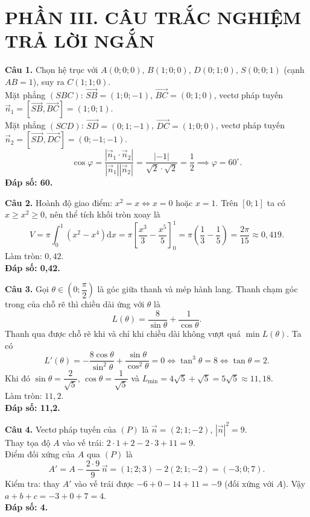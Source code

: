 \documentclass[12pt,a4paper]{article}
\begin{document}
\vspace{0.4cm}
\section*{\large PHẦN III. CÂU TRẮC NGHIỆM TRẢ LỜI NGẮN}

\noindent\textbf{Câu 1.} Chọn hệ trục với $A(0; 0; 0)$, $B(1; 0; 0)$, $D(0; 1; 0)$, $S(0; 0; 1)$ (cạnh $AB = 1$), suy ra $C(1; 1; 0)$.\\
Mặt phẳng $(SBC)$: $\overrightarrow{SB} = (1; 0; -1)$, $\overrightarrow{BC} = (0; 1; 0)$, vectơ pháp tuyến $\vec{n}_1 = [\overrightarrow{SB}, \overrightarrow{BC}] = (1; 0; 1)$.\\
Mặt phẳng $(SCD)$: $\overrightarrow{SD} = (0; 1; -1)$, $\overrightarrow{DC} = (1; 0; 0)$, vectơ pháp tuyến $\vec{n}_2 = [\overrightarrow{SD}, \overrightarrow{DC}] = (0; -1; -1)$.
\[
\cos\varphi = \dfrac{|\vec{n}_1\cdot\vec{n}_2|}{|\vec{n}_1||\vec{n}_2|} = \dfrac{|-1|}{\sqrt{2}\cdot\sqrt{2}} = \dfrac{1}{2} \implies \varphi = 60^\circ.
\]
\textbf{Đáp số: 60.}

\vspace{0.3cm}
\noindent\textbf{Câu 2.} Hoành độ giao điểm: $x^2 = x \iff x = 0$ hoặc $x = 1$. Trên $[0; 1]$ ta có $x \ge x^2 \ge 0$, nên thể tích khối tròn xoay là
\[
V = \pi\int_0^1 \left(x^2 - x^4\right)\mathrm{d}x = \pi\left[\dfrac{x^3}{3} - \dfrac{x^5}{5}\right]_0^1 = \pi\left(\dfrac{1}{3} - \dfrac{1}{5}\right) = \dfrac{2\pi}{15} \approx 0{,}419.
\]
Làm tròn: $0{,}42$.\\
\textbf{Đáp số: 0,42.}

\vspace{0.3cm}
\noindent\textbf{Câu 3.} Gọi $\theta \in \left(0; \dfrac{\pi}{2}\right)$ là góc giữa thanh và mép hành lang. Thanh chạm góc trong của chỗ rẽ thì chiều dài ứng với $\theta$ là
\[
L(\theta) = \dfrac{8}{\sin\theta} + \dfrac{1}{\cos\theta}.
\]
Thanh qua được chỗ rẽ khi và chỉ khi chiều dài không vượt quá $\min L(\theta)$. Ta có
\[
L'(\theta) = -\dfrac{8\cos\theta}{\sin^2\theta} + \dfrac{\sin\theta}{\cos^2\theta} = 0 \iff \tan^3\theta = 8 \iff \tan\theta = 2.
\]
Khi đó $\sin\theta = \dfrac{2}{\sqrt{5}}$, $\cos\theta = \dfrac{1}{\sqrt{5}}$ và $L_{\min} = 4\sqrt{5} + \sqrt{5} = 5\sqrt{5} \approx 11{,}18$.\\
Làm tròn: $11{,}2$.\\
\textbf{Đáp số: 11,2.}

\vspace{0.3cm}
\noindent\textbf{Câu 4.} Vectơ pháp tuyến của $(P)$ là $\vec{n} = (2; 1; -2)$, $|\vec{n}|^2 = 9$.\\
Thay tọa độ $A$ vào vế trái: $2\cdot 1 + 2 - 2\cdot 3 + 11 = 9$.\\
Điểm đối xứng của $A$ qua $(P)$ là
\[
A' = A - \dfrac{2\cdot 9}{9}\,\vec{n} = (1; 2; 3) - 2(2; 1; -2) = (-3; 0; 7).
\]
Kiểm tra: thay $A'$ vào vế trái được $-6 + 0 - 14 + 11 = -9$ (đối xứng với $A$). Vậy $a + b + c = -3 + 0 + 7 = 4$.\\
\textbf{Đáp số: 4.}
\end{document}
